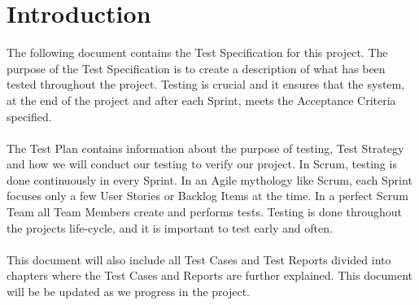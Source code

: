 \section{Introduction}
The following document contains the Test Specification for this project. The purpose of the Test Specification is to create a description of what has been tested throughout the project. Testing is crucial and it ensures that the system, at the end of the project and after each Sprint, meets the Acceptance Criteria specified.\\
\\
The Test Plan contains information about the purpose of testing, Test Strategy and how we will conduct our testing to verify our project. In Scrum, testing is done continuously in every Sprint. In an Agile mythology like Scrum, each Sprint focuses only a few User Stories or Backlog Items at the time. In a perfect Scrum Team all Team Members create and performs tests. Testing is done throughout the projects life-cycle, and it is important to test early and often.\\
\\
This document will also include all Test Cases and Test Reports divided into chapters where the Test Cases and Reports are further explained. This document will be be updated as we progress in the project.
\newpage